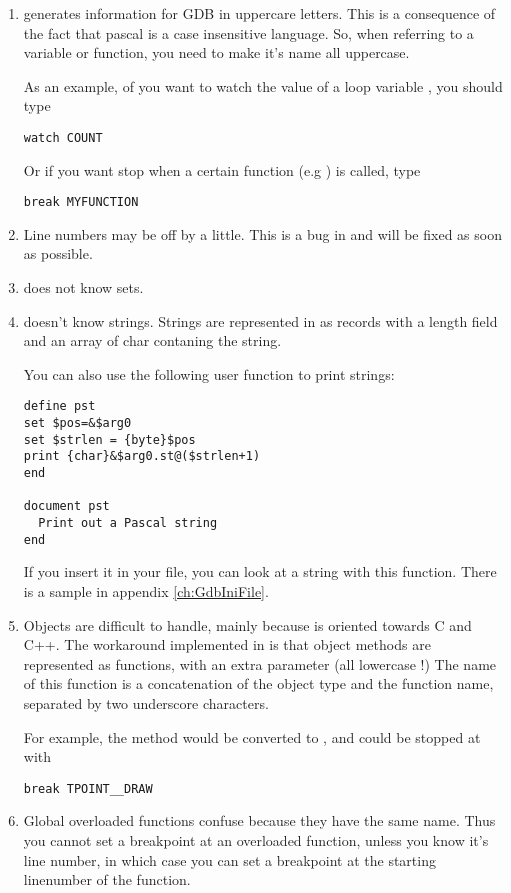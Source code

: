 \documentclass{book}
\begin{document}
\begin{enumerate}
\item \fpc generates information for GDB in uppercare letters. This is a
consequence of the fact that pascal is a case insensitive language. So, when
referring to a variable or function, you need to make it's name all
uppercase.

As an example, of you want to watch the value of a loop variable
, you should type
\begin{verbatim}
watch COUNT
\end{verbatim}
Or if you want stop when a certain function (e.g ) is called,
type
\begin{verbatim}
break MYFUNCTION
\end{verbatim}

\item Line numbers may be off by a little. This is a bug in \fpc and will be
fixed as soon as possible.

\item {} does not know sets.

\item {} doesn't know strings. Strings are represented in 
as records with a length field and an array of char contaning the string.

You can also use the following user function to print strings:
\begin{verbatim}
define pst
set $pos=&$arg0
set $strlen = {byte}$pos
print {char}&$arg0.st@($strlen+1)
end

document pst
  Print out a Pascal string
end
\end{verbatim}
If you insert it in your  file, you can look at a string with this
function. There is a sample  in appendix \ref{ch:GdbIniFile}.

\item Objects are difficult to handle, mainly because  is oriented
towards C and C++. The workaround implemented in \fpc is that object methods
are represented as functions, with an extra parameter  (all
lowercase !) The name of this function is a concatenation of the object type
and the function name, separated by two underscore characters.

For example, the method  would be converted to
, and could be stopped at with
\begin{verbatim}
break TPOINT__DRAW
\end{verbatim}

\item Global overloaded functions confuse  because they have the same
name. Thus you cannot set a breakpoint at an overloaded function, unless you
know it's line number, in which case you can set a breakpoint at the
starting linenumber of the function.
\end{enumerate}
\end{document}
